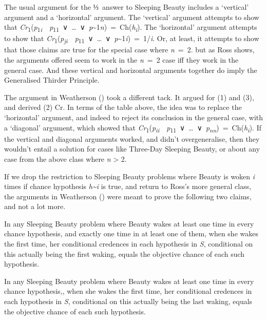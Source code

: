\documentclass[
  11pt,
  letterpaper,
  DIV=11,
  numbers=noendperiod,
  twoside]{scrartcl}
\providecommand{\tightlist}{%
  \setlength{\itemsep}{0pt}\setlength{\parskip}{0pt}}\usepackage{longtable,booktabs,array}
\begin{document}
The usual argument for the ⅓~answer to Sleeping Beauty includes a
`vertical' argument and a `horizontal' argument. The `vertical' argument
attempts to show that
\emph{Cr}\textsubscript{1}(\emph{p}\textsubscript{1\emph{i}}~\textbar~\emph{p}\textsubscript{11}~∨~\ldots~∨~\emph{p}\textasciitilde1\emph{n})~=~Ch(\emph{h\textsubscript{i}}).
The `horizontal' argument attempts to show that
\emph{Cr}\textsubscript{1}(\emph{p\textsubscript{ji}}~\textbar~\emph{p}\textsubscript{11}~∨~\ldots~∨~\emph{p}\textasciitilde1\emph{i})~=~1/\emph{i}.
Or, at least, it attempts to show that those claims are true for the
special case where \emph{n}~=~2. but as Ross shows, the arguments
offered seem to work in the \emph{n}~=~2 case iff they work in the
general case. And these vertical and horizontal arguments together do
imply the Generalised Thirder Principle.

The argument in Weatherson () took a
different tack. It argued for (1) and (3), and derived (2) Cr. In terms
of the table above, the idea was to replace the `horizontal' argument,
and indeed to reject its conclusion in the general case, with a
`diagonal' argument, which showed that
\emph{Cr}\textsubscript{1}(\emph{p\textsubscript{ii}}~\textbar~\emph{p}\textsubscript{11}~∨~\ldots~∨~\emph{p\textsubscript{nn}})~=~Ch(\emph{h\textsubscript{i}}).
If the vertical and diagonal arguments worked, and didn't
overgeneralise, then they wouldn't entail a solution for cases like
Three-Day Sleeping Beauty, or about any case from the above class where
\emph{n} \textgreater{} 2.

If we drop the restriction to Sleeping Beauty problems where Beauty is
woken \emph{i} times if chance hypothesis \emph{h\textasciitilde i} is
true, and return to Ross's more general class, the arguments in
Weatherson () were meant to prove
the following two claims, and not a lot more.

\begin{description}
\tightlist
\item[First Day]
In any Sleeping Beauty problem where Beauty wakes at least one time in
every chance hypothesis, and exactly one time in at least one of them,
when she wakes the first time, her conditional credences in each
hypothesis in \emph{S}, conditional on this actually being the first
waking, equals the objective chance of each such hypothesis.
\item[Last Day]
In any Sleeping Beauty problem where Beauty wakes at least one time in
every chance hypothesis,, when she wakes the first time, her conditional
credences in each hypothesis in \emph{S}, conditional on this actually
being the last waking, equals the objective chance of each such
hypothesis.
\end{description}
\end{document}
